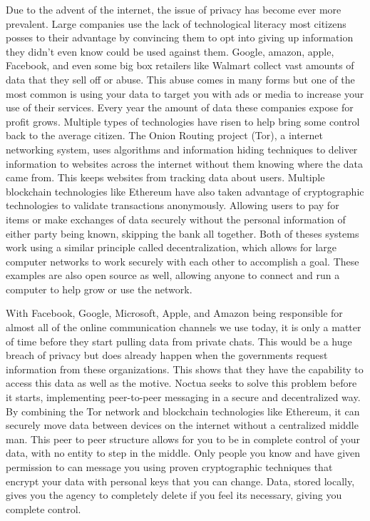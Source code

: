 \documentclass[../main/main.tex]{subfiles}
\begin{document}
Due to the advent of the internet, the issue of privacy has become ever more prevalent. 
Large companies use the lack of technological literacy most citizens posses to their advantage by convincing them to opt into giving up information they didn’t even know could be used against them. Google, amazon, apple, Facebook, and even some big box retailers like Walmart collect vast amounts of data that they sell off or abuse. 
This abuse comes in many forms but one of the most common is using your data to target you with ads or media to increase your use of their services. 
Every year the amount of data these companies expose for profit grows. Multiple types of technologies have risen to help bring some control back to the average citizen. 
The Onion Routing project (Tor), a internet networking system, uses algorithms and information hiding techniques to deliver information to websites across the internet without them knowing where the data came from. 
This keeps websites from tracking data about users. 
Multiple blockchain technologies like Ethereum have also taken advantage of cryptographic technologies to validate transactions anonymously. 
Allowing users to pay for items or make exchanges of data securely without the personal information of either party being known, skipping the bank all together. 
Both of theses systems work using a similar principle called decentralization, which allows for large computer networks to work securely with each other to accomplish a goal. 
These examples are also open source as well, allowing anyone to connect and run a computer to help grow or use the network.

With Facebook, Google, Microsoft, Apple, and Amazon being responsible for almost all of the online communication channels we use today, it is only a matter of time before they start pulling data from private chats. 
This would be a huge breach of privacy but does already happen when the governments request information from these organizations. This shows that they have the capability to access this data as well as the motive. 
Noctua seeks to solve this problem before it starts, implementing peer-to-peer messaging in a secure and decentralized way. 
By combining the Tor network and blockchain technologies like Ethereum, it can securely move data between devices on the internet without a centralized middle man. 
This peer to peer structure allows for you to be in complete control of your data, with no entity to step in the middle. 
Only people you know and have given permission to can message you using proven cryptographic techniques that encrypt your data with personal keys that you can change. 
Data, stored locally, gives you the agency to completely delete if you feel its necessary, giving you complete control. 
\end{document}
